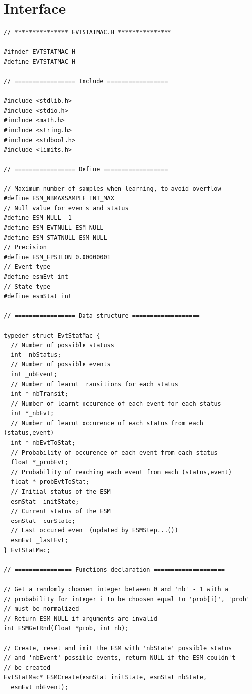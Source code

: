 \documentclass[12pt, a4paper]{article}
\begin{document}
\section{Interface}

\begin{scriptsize}
\begin{ttfamily}
\begin{lstlisting}
// *************** EVTSTATMAC.H ***************

#ifndef EVTSTATMAC_H
#define EVTSTATMAC_H

// ================= Include =================

#include <stdlib.h>
#include <stdio.h>
#include <math.h>
#include <string.h>
#include <stdbool.h>
#include <limits.h>

// ================= Define ==================

// Maximum number of samples when learning, to avoid overflow
#define ESM_NBMAXSAMPLE INT_MAX
// Null value for events and status
#define ESM_NULL -1
#define ESM_EVTNULL ESM_NULL
#define ESM_STATNULL ESM_NULL
// Precision
#define ESM_EPSILON 0.00000001
// Event type
#define esmEvt int
// State type
#define esmStat int

// ================= Data structure ===================

typedef struct EvtStatMac {
  // Number of possible statuss
  int _nbStatus;
  // Number of possible events
  int _nbEvent;
  // Number of learnt transitions for each status 
  int *_nbTransit;
  // Number of learnt occurence of each event for each status
  int *_nbEvt;
  // Number of learnt occurence of each status from each (status,event)
  int *_nbEvtToStat;
  // Probability of occurence of each event from each status
  float *_probEvt;
  // Probability of reaching each event from each (status,event)
  float *_probEvtToStat;
  // Initial status of the ESM
  esmStat _initState;
  // Current status of the ESM
  esmStat _curState;
  // Last occured event (updated by ESMStep...())
  esmEvt _lastEvt;
} EvtStatMac;

// ================ Functions declaration ====================

// Get a randomly choosen integer between 0 and 'nb' - 1 with a 
// probability for integer i to be choosen equal to 'prob[i]', 'prob' 
// must be normalized
// Return ESM_NULL if arguments are invalid
int ESMGetRnd(float *prob, int nb);

// Create, reset and init the ESM with 'nbState' possible status 
// and 'nbEvent' possible events, return NULL if the ESM couldn't 
// be created 
EvtStatMac* ESMCreate(esmStat initState, esmStat nbState, 
  esmEvt nbEvent);


\end{lstlisting}
\end{ttfamily}
\end{scriptsize}
\end{document}
